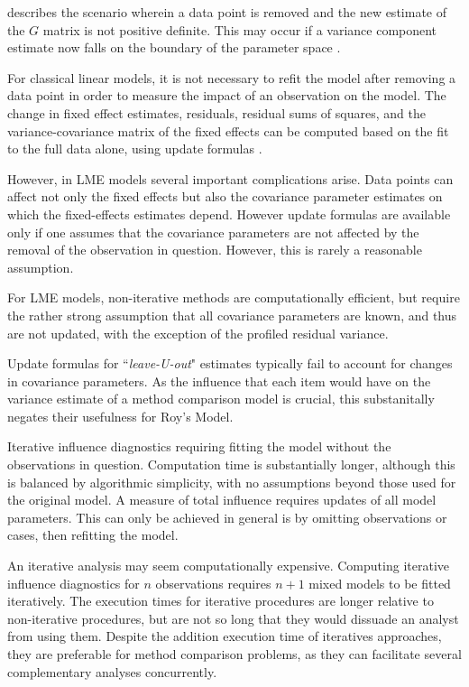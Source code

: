 \documentclass[12pt, a4paper]{report}
\theoremstyle{definition}
\theoremstyle{remark}
\begin{document}
\citet{schabenberger} describes the scenario wherein a data point is removed and the new estimate of the $G$ matrix is not positive definite. This may occur if a variance component
	estimate now falls on the boundary of the parameter space \citep{schabenberger}. 
	
For classical linear models, it is not necessary to refit the model after removing a data point in order to measure the impact of an observation on the model. The change in fixed effect estimates, residuals, residual sums of squares, and the variance-covariance matrix of the fixed effects can be computed based on the fit to the full data alone, using update formulas \citep{sherman, hager1989}.
	
	
However, in LME models several important complications arise. Data points can affect not only the fixed effects but also the covariance parameter estimates on which the fixed-effects estimates depend. However update formulas are available only if one assumes that the covariance parameters are not affected by the removal of the observation in question. However, this is rarely a reasonable assumption.

For LME models, non-iterative methods are computationally efficient, but require the rather strong assumption that all covariance parameters are known, and thus are not updated, with the exception of the profiled residual variance.
	
	Update formulas for ``\textit{leave-U-out}" estimates typically fail to account for changes in covariance parameters.  As the influence that each item would have on the variance estimate of a method comparison model is crucial, this substanitally negates their usefulness for Roy's Model.
	
Iterative influence diagnostics requiring fitting the model without the observations in question. Computation time is substantially longer, although this is balanced by algorithmic simplicity, with no assumptions beyond those used for the original model. A measure of total influence requires updates of all model parameters. This can only be achieved in general is by omitting observations or cases, then refitting the model. 
	
	
An iterative analysis may seem computationally expensive. Computing iterative influence diagnostics for $n$ observations requires $n+1$ mixed models to be fitted iteratively.
	The execution times for iterative procedures are longer relative to non-iterative procedures, but are not so long that they would dissuade an analyst from using them.
	Despite the addition execution time of iteratives
	approaches, they are preferable for method comparison problems, as they can facilitate several complementary analyses concurrently. 
	
\end{document}
